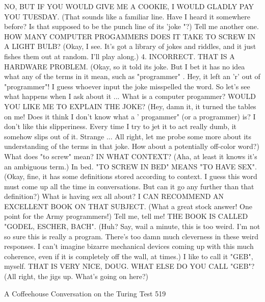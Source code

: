NO, BUT IF YOU WOULD GIVE ME A COOKIE, I WOULD GLADLY PAY
YOU TUESDAY.
(That sounds like a familiar line. Have I heard it somewhere before? Is that supposed
to be the punch line of its 'joke "?)
Tell me another one.
HOW MANY COMPUTER PROGAMMERS DOES IT TAKE TO SCREW IN A
LIGHT BULB?
(Okay, I see. It's got a library of jokes and riddles, and it just fishes them out at
random. I'll play along.)
4.
INCORRECT. THAT IS A HARDWARE PROBLEM.
(Okay, so it told its joke. But I bet it has no idea what any of the terms in it mean, such
as "programmer" . Hey, it left an 'r' out of "programmer"! I guess whoever input the
joke misspelled the word. So let's see what happens when I ask about it ...
What is a computer progammer?
WOULD YOU LIKE ME TO EXPLAIN THE JOKE?
(Hey, damn it, it turned the tables on me! Does it think I don't know what a '
progammer" (or a programmer) is? I don't like this slipperiness. Every time I try to
jet it to act really dumb, it somehow slips out of it. Strange ... All right, let me probe
some more about its understanding of the terms in that joke. How about a potentially
off-color word?)
What does "to screw" mean?
IN WHAT CONTEXT?
(Aha, at least it knows it's an ambiguous term.)
In bed.
"TO SCREW IN BED" MEANS "TO HAVE SEX".
(Okay, fine, it has some definitions stored according to context. I guess this word must
come up all the time in conversations. But can it go any further than that definition?)
What is having sex all about?
I CAN RECOMMEND AN EXCELLENT BOOK ON THAT SUBJECT.
(What a great stock answer! One point for the Army programmers!)
Tell me, tell me!
THE BOOK IS CALLED "GODEL, ESCHER, BACH".
(Huh? Say, wail a minute, this is too weird. I'm not so sure this is really a program.
There's too damn much cleverness in these weird responses. I can't imagine bizarre
mechanical devices coming up with this much coherence, even if it is completely off
the wall, at times.)
I like to call it "GEB", myself.
THAT IS VERY NICE, DOUG. WHAT ELSE DO YOU CALL "GEB"?
(All right, the jigs up. What's going on here?)




A Coffeehouse Conversation on the Turing Test                                          519

